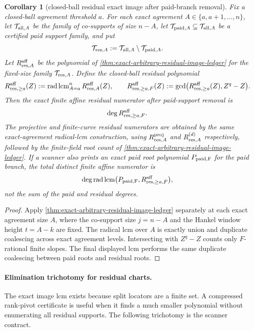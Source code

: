 \documentclass[11pt]{article}
\newtheorem{corollary}[theorem]{Corollary}
\theoremstyle{definition}
\theoremstyle{remark}
\begin{document}
\begin{corollary}[closed-ball residual exact image after paid-branch removal]
\label{cor:residual-exact-image-after-paid-removal}
Fix a closed-ball agreement threshold $a$.  For each exact agreement
$A\in\{a,a+1,\ldots,n\}$, let $\mathcal T_{{\rm all},A}$ be the family of
co-supports of size $n-A$, let $\mathcal T_{{\rm paid},A}\subseteq
\mathcal T_{{\rm all},A}$ be a certified paid support family, and put
\[
        \mathcal T_{{\rm res},A}
        :=\mathcal T_{{\rm all},A}\setminus\mathcal T_{{\rm paid},A}.
\]
Let $R_{{\rm res},A}^{\rm aff}$ be the polynomial of
\cref{thm:exact-arbitrary-residual-image-ledger} for the fixed-size family
$\mathcal T_{{\rm res},A}$.  Define the closed-ball residual polynomial
\[
        R_{{\rm res},\ge a}^{\rm aff}(Z)
        :=\operatorname{rad}\operatorname{lcm}_{A=a}^{n}
          R_{{\rm res},A}^{\rm aff}(Z),
        \qquad
        R_{{\rm res},\ge a,F}^{\rm aff}(Z)
        :=\gcd\bigl(R_{{\rm res},\ge a}^{\rm aff}(Z),Z^q-Z\bigr).
\]
Then the exact finite affine residual numerator after paid-support removal is
\[
        \deg R_{{\rm res},\ge a,F}^{\rm aff}.
\]
The projective and finite-curve residual numerators are obtained by the same
exact-agreement radical-lcm construction, using
$R_{{\rm res},A}^{\rm proj}$ and $R_{{\rm res},A}^{(d)}$ respectively, followed by
the finite-field root count of \cref{thm:exact-arbitrary-residual-image-ledger}.
If a scanner also prints an exact paid root polynomial $P_{\rm paid,F}$ for the
paid branch, the total distinct finite affine numerator is
\[
        \deg\operatorname{rad}\operatorname{lcm}
        \bigl(P_{\rm paid,F},R_{{\rm res},\ge a,F}^{\rm aff}\bigr),
\]
not the sum of the paid and residual degrees.
\end{corollary}

\begin{proof}
Apply \cref{thm:exact-arbitrary-residual-image-ledger} separately at each exact
agreement size $A$, where the co-support size $j=n-A$ and the Hankel window
height $t=A-k$ are fixed.  The radical lcm over $A$ is exactly union and duplicate
coalescing across exact agreement levels.  Intersecting with $Z^q-Z$ counts only
$F$-rational finite slopes.  The final displayed lcm performs the same duplicate
coalescing between paid roots and residual roots.
\end{proof}

\paragraph{Elimination trichotomy for residual charts.}
The exact image lcm exists because split locators are a finite set.  A compressed
rank-pivot certificate is useful when it finds a much smaller polynomial without
enumerating all residual supports.  The following trichotomy is the scanner
contract.
\end{document}
